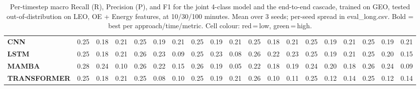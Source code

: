 \begin{table}[t]
{\begin{tabular}{l ccc ccc ccc ccc ccc ccc}
\textbf{CNN} & \cellcolor[HTML]{FF6B6B}0.25 & \cellcolor[HTML]{FF6B6B}0.18 & \cellcolor[HTML]{FF6B6B}0.21 & \cellcolor[HTML]{FF6B6B}0.25 & \cellcolor[HTML]{FF6B6B}0.19 & \cellcolor[HTML]{FF6B6B}0.21 & \cellcolor[HTML]{FF6B6B}0.25 & \cellcolor[HTML]{FF6B6B}0.19 & \cellcolor[HTML]{FF6B6B}0.21 & \cellcolor[HTML]{FF6B6B}0.25 & \cellcolor[HTML]{FF6B6B}0.18 & \cellcolor[HTML]{FF6B6B}0.21 & \cellcolor[HTML]{FF6B6B}0.25 & \cellcolor[HTML]{FF6B6B}0.19 & \cellcolor[HTML]{FF6B6B}0.21 & \cellcolor[HTML]{FF6B6B}0.25 & \cellcolor[HTML]{FF6B6B}0.19 & \cellcolor[HTML]{FF6B6B}0.21 \\
\textbf{LSTM} & \cellcolor[HTML]{FF6B6B}0.25 & \cellcolor[HTML]{FF6B6B}0.18 & \cellcolor[HTML]{FF6B6B}0.21 & \cellcolor[HTML]{FF6F69}0.26 & \cellcolor[HTML]{FF6B6B}0.23 & \cellcolor[HTML]{FF6B6B}0.09 & \cellcolor[HTML]{FF6C6A}0.25 & \cellcolor[HTML]{FF6B6B}0.23 & \cellcolor[HTML]{FF6B6B}0.08 & \cellcolor[HTML]{FF6F69}0.26 & \cellcolor[HTML]{FF6B6B}0.22 & \cellcolor[HTML]{FF6B6B}0.23 & \cellcolor[HTML]{FF6B6B}0.25 & \cellcolor[HTML]{FF6B6B}0.19 & \cellcolor[HTML]{FF6B6B}0.21 & \cellcolor[HTML]{FF6B6B}0.25 & \cellcolor[HTML]{FF6B6B}0.20 & \cellcolor[HTML]{FF6B6B}0.15 \\
\textbf{MAMBA} & \cellcolor[HTML]{FF7965}0.28 & \cellcolor[HTML]{FF6B6B}0.24 & \cellcolor[HTML]{FF6B6B}0.10 & \cellcolor[HTML]{FF6F69}0.26 & \cellcolor[HTML]{FF6B6B}0.22 & \cellcolor[HTML]{FF6B6B}0.15 & \cellcolor[HTML]{FF6D6A}0.26 & \cellcolor[HTML]{FF6B6B}0.19 & \cellcolor[HTML]{FF6B6B}0.05 & \cellcolor[HTML]{FF6B6B}0.22 & \cellcolor[HTML]{FF6B6B}0.18 & \cellcolor[HTML]{FF6B6B}0.19 & \cellcolor[HTML]{FF6B6B}0.24 & \cellcolor[HTML]{FF6B6B}0.20 & \cellcolor[HTML]{FF6B6B}0.18 & \cellcolor[HTML]{FF6E69}0.26 & \cellcolor[HTML]{FF6B6B}0.24 & \cellcolor[HTML]{FF6B6B}0.09 \\
\textbf{TRANSFORMER} & \cellcolor[HTML]{FF6B6B}0.25 & \cellcolor[HTML]{FF6B6B}0.18 & \cellcolor[HTML]{FF6B6B}0.21 & \cellcolor[HTML]{FF6B6B}0.25 & \cellcolor[HTML]{FF6B6B}0.08 & \cellcolor[HTML]{FF6B6B}0.10 & \cellcolor[HTML]{FF6B6B}0.25 & \cellcolor[HTML]{FF6B6B}0.19 & \cellcolor[HTML]{FF6B6B}0.21 & \cellcolor[HTML]{FF6E69}0.26 & \cellcolor[HTML]{FF6B6B}0.10 & \cellcolor[HTML]{FF6B6B}0.11 & \cellcolor[HTML]{FF6B6B}0.25 & \cellcolor[HTML]{FF6B6B}0.12 & \cellcolor[HTML]{FF6B6B}0.14 & \cellcolor[HTML]{FF6B6B}0.25 & \cellcolor[HTML]{FF6B6B}0.12 & \cellcolor[HTML]{FF6B6B}0.14 \\
\bottomrule
\end{tabular}%
}
\caption{Per-timestep macro Recall (R), Precision (P), and F1 for the joint 4-class model and the end-to-end cascade, trained on GEO, tested out-of-distribution on LEO, OE + Energy features, at 10/30/100 minutes. Mean over 3 seeds; per-seed spread in eval\_long.csv. Bold = best per approach/time/metric. Cell colour: red\,=\,low, green\,=\,high.}
\label{tab:seq_geo_to_leo_phys_jc}
\end{table}
